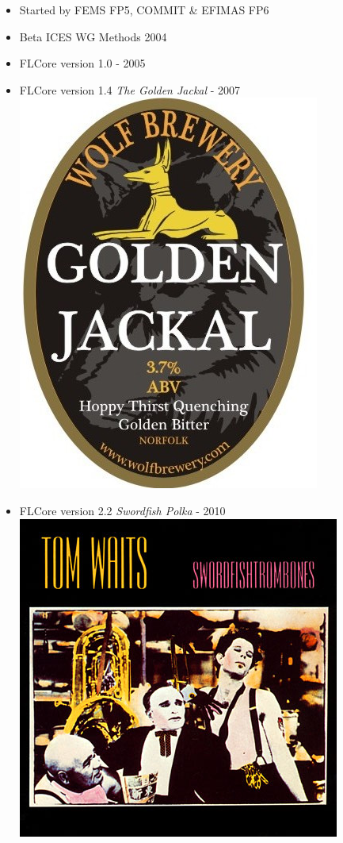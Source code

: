 \documentclass[]{article}
\providecommand{\tightlist}{%
  \setlength{\itemsep}{0pt}\setlength{\parskip}{0pt}}
\begin{document}
\begin{itemize}
\tightlist
\item
  Started by FEMS FP5, COMMIT \& EFIMAS FP6
\item
  Beta ICES WG Methods 2004
\item
  FLCore version 1.0 - 2005
\item
  FLCore version 1.4 \emph{The Golden Jackal} - 2007
  \hfill\includegraphics[keepaspectratio, height=0.15\textheight]{graphics/WolfGoldenJackal.jpg}
\item
  FLCore version 2.2 \emph{Swordfish Polka} - 2010
  \hfill\includegraphics[keepaspectratio, height=0.15\textheight]{graphics/flr20.png}

\end{itemize}
\end{document}
